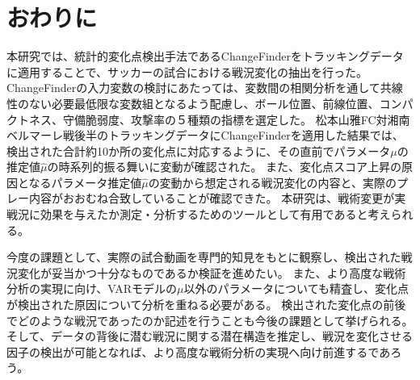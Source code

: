 \section{おわりに}
\label{sec:owarini}

本研究では、統計的変化点検出手法であるChangeFinderをトラッキングデータに適用することで、サッカーの試合における戦況変化の抽出を行った。
ChangeFinderの入力変数の検討にあたっては、変数間の相関分析を通して共線性のない必要最低限な変数組となるよう配慮し、ボール位置、前線位置、コンパクトネス、守備脆弱度、攻撃率の５種類の指標を選定した。
松本山雅FC対湘南ベルマーレ戦後半のトラッキングデータにChangeFinderを適用した結果では、検出された合計約10か所の変化点に対応するように、その直前でパラメータ$\mu$の推定値$\hat{\mu}$の時系列的振る舞いに変動が確認された。
また、変化点スコア上昇の原因となるパラメータ推定値$\hat{\mu}$の変動から想定される戦況変化の内容と、実際のプレー内容がおおむね合致していることが確認できた。
本研究は、戦術変更が実戦況に効果を与えたか測定・分析するためのツールとして有用であると考えられる。

今度の課題として、実際の試合動画を専門的知見をもとに観察し、検出された戦況変化が妥当かつ十分なものであるか検証を進めたい。
また、より高度な戦術分析の実現に向け、VARモデルの$\mu$以外のパラメータについても精査し、変化点が検出された原因について分析を重ねる必要がある。
検出された変化点の前後でどのような戦況であったのか記述を行うことも今後の課題として挙げられる。
そして、データの背後に潜む戦況に関する潜在構造を推定し、戦況を変化させる因子の検出が可能となれば、より高度な戦術分析の実現へ向け前進するであろう。



